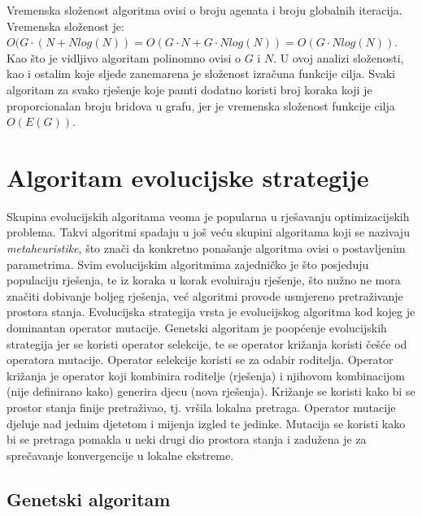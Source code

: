 \documentclass[times, utf8, diplomski, numeric]{fer}
\begin{document}
Vremenska složenost algoritma ovisi o broju agenata i broju globalnih iteracija. Vremenska složenost je: $O(G\cdot(N+Nlog(N))=O(G\cdot N+G\cdot Nlog(N))=O(G\cdot Nlog(N))$. Kao što je vidljivo algoritam polinomno ovisi o $G$ i $N$. U ovoj analizi složenosti, kao i ostalim koje sljede zanemarena je složenost izračuna funkcije cilja. Svaki algoritam za svako rješenje koje pamti dodatno koristi broj koraka koji je proporcionalan broju bridova u grafu, jer je vremenska složenost funkcije cilja $O(E(G))$. 

\section{Algoritam evolucijske strategije}

Skupina evolucijskih algoritama veoma je popularna u rješavanju optimizacijskih problema. Takvi algoritmi spadaju u još veću skupini algoritama koji se nazivaju \emph{metaheuristike}, što znači da konkretno ponašanje algoritma ovisi o postavljenim parametrima. Svim evolucijskim algoritmima zajedničko je što posjeduju populaciju rješenja, te iz koraka u korak evoluiraju rješenje, što nužno ne mora značiti dobivanje boljeg rješenja, već algoritmi provode usmjereno pretraživanje prostora stanja. Evolucijska strategija vrsta je evolucijskog algoritma kod kojeg je dominantan operator mutacije. Genetski algoritam je poopćenje evolucijskih strategija jer se koristi operator selekcije, te se operator križanja koristi češće od operatora mutacije. Operator selekcije koristi se za odabir roditelja. Operator križanja je operator koji kombinira roditelje (rješenja) i njihovom kombinacijom (nije definirano kako) generira djecu (nova rješenja). Križanje se koristi kako bi se prostor stanja finije pretraživao, tj. vršila lokalna pretraga. Operator mutacije djeluje nad jednim djetetom i mijenja izgled te jedinke. Mutacija se koristi kako bi se pretraga pomakla u neki drugi dio prostora stanja i zadužena je za sprečavanje konvergencije u lokalne ekstreme. 

\subsection{Genetski algoritam}
\end{document}
